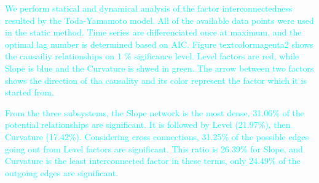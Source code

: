 \documentclass[12pt,bibliography=totoc]{article}
\begin{document}
\textcolor{cyan}{We perform statical and dynamical analysis of the factor interconnectedness resulted by the Toda-Yamamoto model. All of the available data points were used in the static method. Time series are differenciated once at maximum, and the optimal lag number is determined based on AIC. Figure textcolor{magenta}{2} shows the causailiy relationships on 1 \% sigificance level. Level factors are red, while Slope is blue and the Curvature is shwed in green. The arrow between two factors shows the direction of tha causality and its color represent the factor which it is started from.}


\textcolor{cyan}{From the three subsystems, the Slope network is the most dense. 31.06\% of the potential relationships are significant. It is followed by Level (21.97\%), then Curvature (17.42\%). Considering cross connections, 31.25\% of the possible edges going out from Level factors are significant. This ratio is 26.39\% for Slope, and Curvature is the least interconnected factor in these terms, only 24.49\% of the outgoing edges are significant.}
\end{document}
